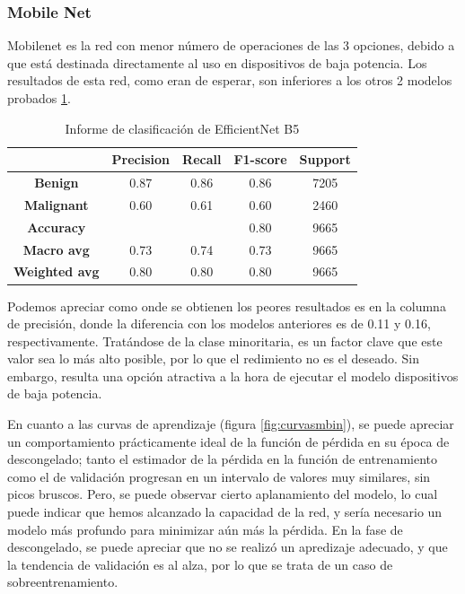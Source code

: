 \subsubsection{Mobile Net}

Mobilenet es la red con menor número de operaciones de las 3 opciones, debido a que está destinada directamente al uso en dispositivos de baja potencia. Los resultados de esta red, como eran de esperar, son inferiores a los otros 2 modelos probados \ref{tab:mob}.   

\begin{table}[H]
	\centering
	\begin{tabular}{|c|c|c|c|c|}
		\hline
		\textbf{} & \textbf{Precision} & \textbf{Recall} & \textbf{F1-score} & \textbf{Support} \\ \hline
		\textbf{Benign} & 0.87 & 0.86 & 0.86 & 7205 \\ \hline
		\textbf{Malignant} & 0.60 & 0.61 & 0.60 & 2460 \\ \hline
		\textbf{Accuracy} &  &  & 0.80 & 9665 \\ \hline
		\textbf{Macro avg} & 0.73 & 0.74 & 0.73 & 9665 \\ \hline
		\textbf{Weighted avg} & 0.80& 0.80 & 0.80 & 9665 \\ \hline
	\end{tabular}
	\caption{Informe de clasificación de EfficientNet B5}
	\label{tab:mob}
\end{table}

Podemos apreciar como onde se obtienen los peores resultados es en la columna de precisión, donde la diferencia con los modelos anteriores es de 0.11 y 0.16, respectivamente. Tratándose de la clase minoritaria, es un factor clave que este valor sea lo más alto posible, por lo que el redimiento no es el deseado. Sin embargo, resulta una opción atractiva a la hora de ejecutar el modelo dispositivos de baja potencia.

En cuanto a las curvas de aprendizaje (figura \ref{fig:curvasmbin}), se puede apreciar un comportamiento prácticamente ideal de la función  de pérdida en su época de descongelado; tanto el estimador de la pérdida en la función de entrenamiento como el de validación progresan en un intervalo de valores muy similares, sin picos bruscos. Pero, se puede observar cierto aplanamiento del modelo, lo cual puede indicar que hemos alcanzado la capacidad de la red, y sería necesario un modelo más profundo para minimizar aún más la pérdida. En la fase de descongelado, se puede apreciar que no se realizó un apredizaje adecuado, y que la tendencia de validación es al alza, por lo que se trata de un caso de sobreentrenamiento.

